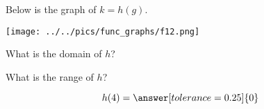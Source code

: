 \documentclass{ximera}
\author{Lee Wayand}
\begin{document}
\begin{exercise}  





Below is the graph of $k=h(g)$.  

\begin{image}
\texttt{[image: ../../pics/func\_graphs/f12.png]}
\end{image}









\begin{question} 


What is the domain of $h$?\\


\begin{multipleChoice}
\choice {$[3, 9]$}
\choice [correct]{$[3, \infty)$}
\end{multipleChoice}

\end{question}






\begin{question} 


What is the range of $h$?\\


\begin{multipleChoice}
\choice {$[3, \infty)$}
\end{multipleChoice}


\end{question}









\begin{question} 



\[  h(4) = \answer[tolerance=0.25]{0}  \]

\end{question}










\begin{question} 




\end{question}
\end{exercise}
\end{document}
